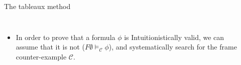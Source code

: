 \documentclass{beamer}
\begin{document}
\begin{frame}{The tableaux method}

\begin{columns}
    \begin{itemize}
            \item In order to prove that a formula $\phi$ is Intuitionistically valid, we can assume that it is not ($F {\emptyset} \vDash_{\mathcal{C}} \phi$), and systematically search for the frame counter-example $\mathcal{C}$.



    \end{itemize}

    \rule{0.2mm}{\textheight} %
\end{columns}
\end{frame}
\end{document}
